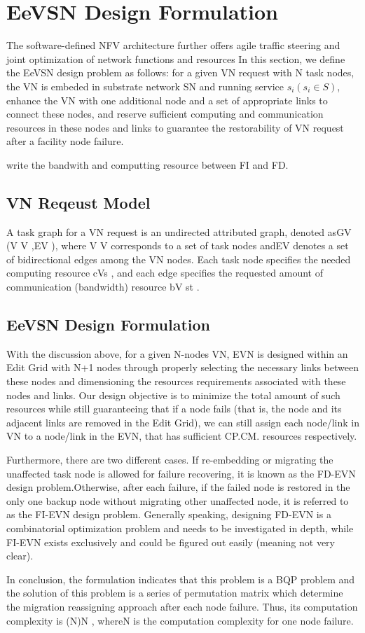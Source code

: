 \section{EeVSN Design Formulation}
The software-defined NFV architecture further offers agile traffic steering and joint optimization of network functions and resources In this section, we define the EeVSN design problem as follows: for a given VN request with N task nodes, the VN is embeded in substrate network SN and running service $s_i(s_i\in S)$, enhance the VN with one additional node and a set of appropriate links to connect these nodes, and reserve sufficient computing and communication resources in these nodes and links to guarantee the restorability of VN request after a facility node failure.

write the bandwith and computting resource between FI and FD.

\subsection{VN Reqeust Model}
A task graph for a VN request is an undirected attributed
graph, denoted asGV (V V ,EV ), where V V corresponds to a set
of task nodes andEV denotes a set of bidirectional edges among
the VN nodes. Each task node specifies the needed computing
resource cVs
, and each edge specifies the requested amount of
communication (bandwidth) resource bV
st .

\subsection{EeVSN Design Formulation}
With the discussion above, for a given N-nodes VN, EVN is designed within an Edit Grid with N+1 nodes through properly
selecting the necessary links between these nodes and dimensioning the resources requirements associated with these nodes
and links. Our design objective is to minimize the total amount of such resources while still guaranteeing that if a node fails
(that is, the node and its adjacent links are removed in the Edit Grid), we can still assign each node/link in VN to a node/link in
the EVN, that has sufficient CP.CM. resources respectively.

Furthermore, there are two different cases. If re-embedding or
migrating the unaffected task node is allowed for failure recovering,
it is known as the FD-EVN design problem.Otherwise, after
each failure, if the failed node is restored in the only one backup
node without migrating other unaffected node, it is referred to
as the FI-EVN design problem. Generally speaking, designing
FD-EVN is a combinatorial optimization problem and needs to
be investigated in depth, while FI-EVN exists exclusively and
could be figured out easily (meaning not very clear).

In conclusion, the formulation indicates that this problem is
a BQP problem and the solution of this problem is a series of
permutation matrix  which determine the
migration reassigning approach after each node failure. Thus, its
computation complexity is (N)N , whereN is the computation
complexity for one node failure.

